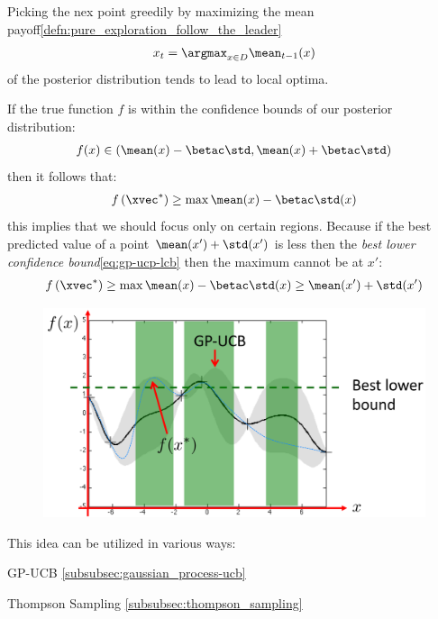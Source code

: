 \begin{sectionbox}[Problem]\nospacing
  Picking the nex point greedily by maximizing the mean payoff\cref{defn:pure_exploration_follow_the_leader}
  \begin{align}
    x_{t}=\argmax_{x\in D}\mean_{t-1}(x)
  \end{align}
  of the posterior distribution tends to lead to local optima.
\end{sectionbox}
\begin{sectionbox}[Assumption]\nospacing
  If the true function $f$ is within the confidence bounds of our posterior distribution:
  \begin{align*}
    f(x)\in(\mean(x)-\betac\std,\mean(x)+\betac\std)
  \end{align*}
  then it follows that:
  \begin{align}
    f\left(\xvec^{*}\right)\geq\max\mean(x)-\betac\std(x)\label{eq:gp-ucp-lcb}
  \end{align}
  this implies that we should focus only on certain regions.
  Because if the best predicted value of a point $\mean(x')+\std(x')$ is less
  then the \textit{best lower confidence bound}\cref{eq:gp-ucp-lcb} then the maximum cannot be at $x'$:
  \begin{align}
    f\left(\xvec^{*}\right)\geq\max\mean(x)-\betac\std(x)\geq\mean(x')+\std(x')
  \end{align}
  \begin{figure}[H]
    \centering
    \includegraphics[width=1.0\textwidth]{src/bayesian_optimization/figures/gp-ucb.png}
  \end{figure}
  This idea can be utilized in various ways:
  \begin{itemizenosep}
    \item GP-UCB \cref{subsubsec:gaussian_process-ucb}
    \item Thompson Sampling \cref{subsubsec:thompson_sampling}
  \end{itemizenosep}
\end{sectionbox}
